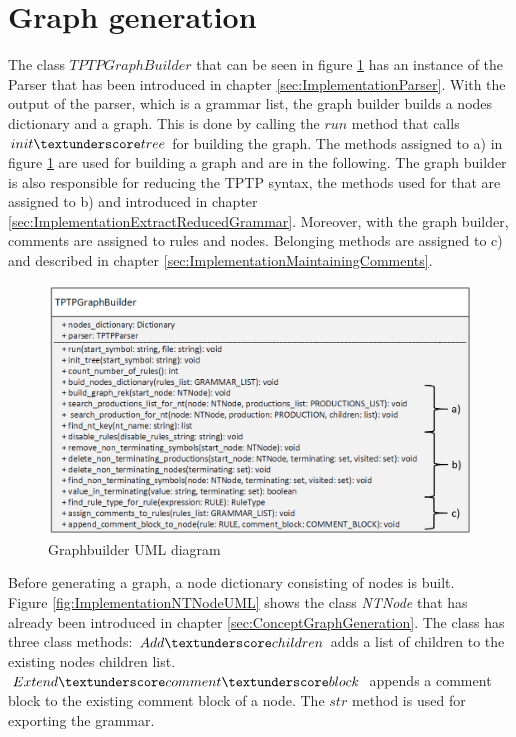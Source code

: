 \section{Graph generation}\label{sec:ImplementationGraphGeneration}

The class $TPTPGraphBuilder$ that can be seen in figure \ref{fig:ImplementationGraphbuilderUML} has an instance of the Parser that has been introduced in chapter \ref{sec:ImplementationParser}. With the output of the parser, which is a grammar list, the graph builder builds a nodes dictionary and a graph. This is done by calling the $run$ method that calls $init\textunderscore tree$ for building the graph.
The methods assigned to a) in figure \ref{fig:ImplementationGraphbuilderUML} are used for building a graph and are in the following. The graph builder is also responsible for reducing the \ac{TPTP} syntax, the methods used for that are assigned to b) and introduced in chapter \ref{sec:ImplementationExtractReducedGrammar}. Moreover, with the graph builder, comments are assigned to rules and nodes. Belonging methods are assigned to c) and described in chapter \ref{sec:ImplementationMaintainingComments}.

\begin{figure}[H]
\centering
\includegraphics[width=1 \textwidth]{images/uml_graphbuilderNEW.png}
\caption{Graphbuilder UML diagram}
\label{fig:ImplementationGraphbuilderUML}
\end{figure}                
               
Before generating a graph, a node dictionary consisting of nodes is built.\\
Figure \ref{fig:ImplementationNTNodeUML} shows the class \textit{NTNode} that has already been introduced in chapter \ref{sec:ConceptGraphGeneration}. The class has three class methods:
$Add\textunderscore children$ adds a list of children to the existing nodes children list. $Extend\textunderscore comment\textunderscore block$ appends a comment block to the existing comment block of a node. The $str$ method is used for exporting the grammar.

